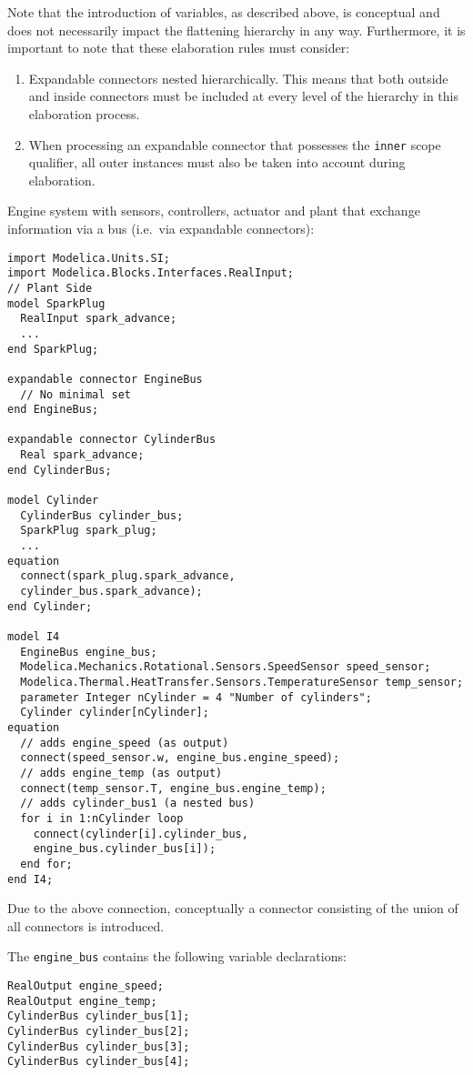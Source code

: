 \begin{nonnormative}
Note that the introduction of variables, as described above, is
conceptual and does not necessarily impact the flattening hierarchy in
any way. Furthermore, it is important to note that these elaboration
rules must consider:
\begin{enumerate}
\item Expandable connectors nested hierarchically. This means that
both outside and inside connectors must be included at every level of
the hierarchy in this elaboration process.
\item When processing an expandable connector that possesses the
\lstinline!inner! scope qualifier, all outer instances must also be taken into
account during elaboration.
\end{enumerate}
\end{nonnormative}

\begin{example}
Engine system with sensors, controllers, actuator and plant that
exchange information via a bus (i.e.\ via expandable connectors):
\begin{lstlisting}[language=modelica]
import Modelica.Units.SI;
import Modelica.Blocks.Interfaces.RealInput;
// Plant Side
model SparkPlug
  RealInput spark_advance;
  ...
end SparkPlug;

expandable connector EngineBus
  // No minimal set
end EngineBus;

expandable connector CylinderBus
  Real spark_advance;
end CylinderBus;

model Cylinder
  CylinderBus cylinder_bus;
  SparkPlug spark_plug;
  ...
equation
  connect(spark_plug.spark_advance,
  cylinder_bus.spark_advance);
end Cylinder;

model I4
  EngineBus engine_bus;
  Modelica.Mechanics.Rotational.Sensors.SpeedSensor speed_sensor;
  Modelica.Thermal.HeatTransfer.Sensors.TemperatureSensor temp_sensor;
  parameter Integer nCylinder = 4 "Number of cylinders";
  Cylinder cylinder[nCylinder];
equation
  // adds engine_speed (as output)
  connect(speed_sensor.w, engine_bus.engine_speed);
  // adds engine_temp (as output)
  connect(temp_sensor.T, engine_bus.engine_temp);
  // adds cylinder_bus1 (a nested bus)
  for i in 1:nCylinder loop
    connect(cylinder[i].cylinder_bus,
    engine_bus.cylinder_bus[i]);
  end for;
end I4;
\end{lstlisting}
Due to the above connection, conceptually a connector consisting
of the union of all connectors is introduced.

The \lstinline!engine_bus! contains the following variable declarations:
\begin{lstlisting}[language=modelica]
RealOutput engine_speed;
RealOutput engine_temp;
CylinderBus cylinder_bus[1];
CylinderBus cylinder_bus[2];
CylinderBus cylinder_bus[3];
CylinderBus cylinder_bus[4];
\end{lstlisting}
\end{example}

